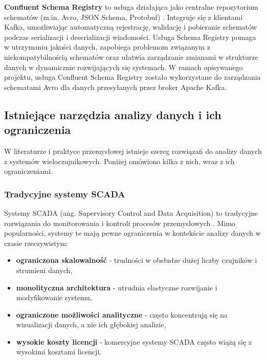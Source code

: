\textbf{Confluent Schema Registry} to usługa działająca jako centralne repozytorium schematów (m.in. Avro, JSON Schema, Protobuf) \cite{confluent_schema_registry}. Integruje się z klientami Kafka, umożliwiając automatyczną rejestrację, walidację i pobieranie schematów podczas serializacji i deserializacji wiadomości. Usługa Schema Registry pomaga w utrzymaniu jakości danych, zapobiega problemom związanym z niekompatybilnością schematów oraz ułatwia zarządzanie zmianami w strukturze danych w dynamicznie rozwijających się systemach. W ramach opisywanego projektu, usługa Confluent Schema Registry zostało wykorzystane do zarządzania schematami Avro dla danych przesyłanych przez broker Apache Kafka.

\subsection{Istniejące narzędzia analizy danych i ich ograniczenia}
\label{subsec:istniejace_rozwiazania}

W literaturze i praktyce przemysłowej istnieje szereg rozwiązań do analizy danych z systemów wieloczujnikowych. Poniżej omówiono kilka z nich, wraz z ich ograniczeniami.

\subsubsection{Tradycyjne systemy SCADA}
\label{subsubsec:scada}

Systemy SCADA (ang. Supervisory Control and Data Acquisition) to tradycyjne rozwiązania do monitorowania i kontroli procesów przemysłowych \cite{scada}.
Mimo popularności, systemy te mają pewne ograniczenia w kontekście analizy danych w czasie rzeczywistym:

\begin{itemize}
    \item \textbf{ograniczona skalowalność} - trudności w obsłudze dużej liczby czujników i strumieni danych,
    \item \textbf{monolityczna architektura} - utrudnia elastyczne rozwijanie i modyfikowanie systemu,
    \item \textbf{ograniczone możliwości analityczne} - często koncentrują się na wizualizacji danych, a nie ich głębokiej analizie,
    \item \textbf{wysokie koszty licencji} - komercyjne systemy SCADA często wiążą się z wysokimi kosztami licencji.
\end{itemize}

